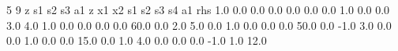 5 9
z
s1
s2
s3
a1
z
x1
x2
s1
s2
s3
s4
a1
rhs
1.0 0.0 0.0 0.0 0.0 0.0 0.0 1.0 0.0 
0.0 3.0 4.0 1.0 0.0 0.0 0.0 0.0 60.0 
0.0 2.0 5.0 0.0 1.0 0.0 0.0 0.0 50.0 
0.0 -1.0 3.0 0.0 0.0 1.0 0.0 0.0 15.0 
0.0 1.0 4.0 0.0 0.0 0.0 -1.0 1.0 12.0 
